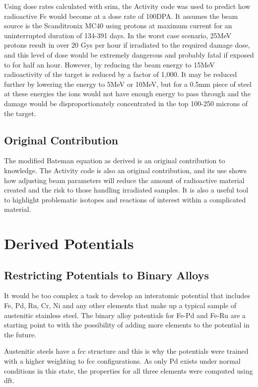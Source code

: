 Using dose rates calculated with \acrshort{srim}, the Activity code was used to predict how radioactive Fe would become at a dose rate of 100DPA.  It assumes the beam source is the Scanditronix MC40 using protons at maximum current for an uninterrupted duration of 134-391 days.  In the worst case scenario, 25MeV protons result in over 20 Gys per hour if irradiated to the required damage dose, and this level of dose would be extremely dangerous and probably fatal if exposed to for half an hour.  However, by reducing the beam energy to 15MeV radioactivity of the target is reduced by a factor of 1,000.  It may be reduced further by lowering the energy to 5MeV or 10MeV, but for a 0.5mm piece of steel at these energies the ions would not have enough energy to pass through and the damage would be disproportionately concentrated in the top 100-250 microns of the target.

\subsection{Original Contribution}

The modified Bateman equation as derived is an original contribution to knowledge.  The Activity code is also an original contribution, and its use shows how adjusting beam parameters will reduce the amount of radioactive material created and the risk to those handling irradiated samples.  It is also a useful tool to highlight problematic isotopes and reactions of interest within a complicated material.



\section{Derived Potentials}

\subsection{Restricting Potentials to Binary Alloys}

It would be too complex a task to develop an interatomic potential that includes Fe, Pd, Ru, Cr, Ni and any other elements that make up a typical sample of austenitic stainless steel.  The binary alloy potentials for Fe-Pd and Fe-Ru are a starting point to with the possibility of adding more elements to the potential in the future.

Austenitic steels have a \acrshort{fcc} structure and this is why the potentials were trained with a higher weighting to \acrshort{fcc} configurations.  As only Pd exists under normal conditions in this state, the properties for all three elements were computed using \acrshort{dft}.


